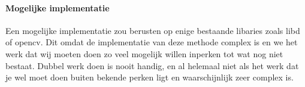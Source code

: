 \documentclass[11pt]{article}
\begin{document}
    \paragraph{Mogelijke implementatie}
    Een mogelijke implementatie zou berusten op enige bestaande libaries zoals libd of opencv.
    Dit omdat de implementatie van deze methode complex is en we het werk dat wij moeten doen zo veel mogelijk willen inperken tot wat nog niet bestaat.
    Dubbel werk doen is nooit handig, en al helemaal niet als het werk dat je wel moet doen buiten bekende perken ligt en waarschijnlijk zeer complex is.

    
\end{document}
